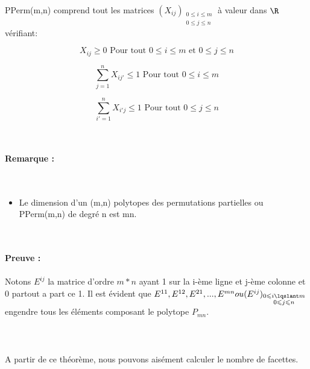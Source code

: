 \documentclass{book}
\begin{document}
 \begin{theorem}
 PPerm(m,n) comprend tout les matrices $(X_{ij})_{\substack {0\leqslant i \leqslant m\\0 \leqslant j \leqslant n}}$ à valeur dans $\R$ vérifiant: \\
 \begin{numerate}
 \item \begin{equation}
 X_{ij}   \geq   0  \text{ Pour tout } 0\leqslant i \leqslant m \text{ et } 0 \leqslant j \leqslant n
 \end{equation}
 \item \begin{equation}
 \sum_{j=1}^{n} X_{ij'} \leqslant 1   \text{ Pour tout } 0\leqslant i \leqslant m
 \end{equation}
 \item \begin{equation}
 \sum_{i'=1}^{n} X_{i'j} \leqslant 1   \text{ Pour tout } 0\leqslant j \leqslant n
 \end{equation}
 \end{numerate} 
 \end{theorem} \\\\
 \textbf{Remarque : \\\\}
\\
\begin{itemize}
\item Le dimension d'un (m,n) polytopes des permutations partielles ou PPerm(m,n) de degré n est mn. \\\\\\
\end{itemize}
\textbf{Preuve :} \\\\
Notons $E^{ij}$ la matrice d'ordre $m*n$ ayant 1 sur la i-ème ligne et j-ème colonne et 0 partout a part ce 1. Il est évident que  $E^{11}, E^{12}, E^{21}, ..., E^{mn} ou (E^{ij})_{\substack {0\leqslant i \lqslant m\\0 \leqslant j \leqslant n}} $ engendre tous les éléments composant le polytope $P_{mn}$. \\\\ 
 \\\\
 A partir de ce théorème, nous pouvons aisément calculer le nombre de facettes.\\\\
\end{document}

